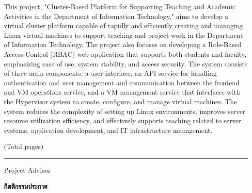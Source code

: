\hspace*{1.5em} %
This project, "Cluster-Based Platform for Supporting Teaching and Academic Activities in the Department of Information Technology," aims to develop a virtual cluster platform capable of rapidly and efficiently creating and managing Linux virtual machines to support teaching and project work in the Department of Information Technology. The project also focuses on developing a Role-Based Access Control (RBAC) web application that supports both students and faculty, emphasizing ease of use, system stability, and access security. The system consists of three main components: a user interface, an API service for handling authentication and user management and communication between the frontend and VM operations service, and a VM management service that interfaces with the Hypervisor system to create, configure, and manage virtual machines. The system reduces the complexity of setting up Linux environments, improves server resource utilization efficiency, and effectively supports teaching related to server systems, application development, and IT infrastructure management.

\begin{flushright}
(Total \pageref{LastPage} pages)

\vfill

\rule{12 cm}{0.4pt} Project Advisor

\end{flushright}


\newpage
{}
{}
\vspace*{-0.5in}

\begin{center}\textbf{กิตติกรรมประกาศ}\end{center}

